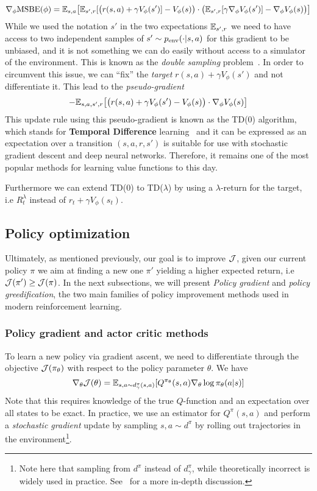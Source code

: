 $$\nabla_\phi \text{MSBE}(\phi) = \mathbb{E}_{s, a} \big[ \mathbb{E}_{s', r}[ \big( r(s,a) + \gamma V_\phi(s')] - V_\phi(s) \big) \cdot \big(\mathbb{E}_{s', r}[ \gamma \nabla_\phi V_\phi(s')] - \nabla_\phi V_\phi(s) \big)\big]$$
While we used the notation $s'$ in the two expectations $\mathbb{E}_{s', r}$ we need to have access to two independent samples of $s' \sim p_{\text{env}}(\cdot |s,a)$ for this gradient to be unbiased, and it is not something we can do easily without access to a simulator of the environment. This is known as the \emph{double sampling} problem~\citep{baird1995residual}. In order to circumvent this issue, we can ``fix'' the \emph{target} $r(s,a) + \gamma V_\phi(s')$ and not differentiate it.
This lead to the \emph{pseudo-gradient}
$$ - \mathbb{E}_{s, a, s', r} \big[\big( r(s,a) + \gamma V_\phi(s') - V_\phi(s) \big) \cdot \nabla_\phi V_\phi(s)\big]$$
This update rule using this pseudo-gradient is known as the TD(0) algorithm, which stands for \textbf{Temporal Difference} learning~\citep{sutton1988learning} and it can be expressed as an expectation over a transition $(s, a, r, s')$
 is suitable for use with stochastic gradient descent and deep neural networks. Therefore, it remains one of the most popular methods for learning value functions to this day.

Furthermore we can extend TD(0) to TD($\lambda$) by using a $\lambda$-return for the target, i.e $R^\lambda_t$ instead of $r_t + \gamma V_\phi(s_t)$.

\subsection{Policy optimization}

Ultimately, as mentioned previously, our goal is to improve ${\mathcal{J}}$, given our current policy $\pi$ we aim at finding a new one $\pi'$ yielding a higher expected return, i.e ${\mathcal{J}}(\pi') \ge {\mathcal{J}}(\pi)$. In the next subsections, we will present \emph{Policy gradient} and \emph{policy greedification}, the two main families of policy improvement methods used in modern reinforcement learning.

\subsubsection{Policy gradient and actor critic methods}
\label{subsec:pg_ac}
To learn a new policy via gradient ascent, we need to differentiate through the objective ${\mathcal{J}}(\pi_\theta)$ with respect to the policy parameter $\theta$.
We have~\citep{williams1992simple, sutton1999policy}
\begin{equation}
    \label{eq:policy_gradient}
    \nabla_\theta {\mathcal{J}}(\theta) = \mathbb{E}_{s, a \sim d^\pi_\gamma(s,a)} [ Q^{\pi_\theta}(s,a) \nabla_\theta \log \pi_\theta(a|s)]
\end{equation}
Note that this requires knowledge of the true $Q$-function and an expectation over all states to be exact. In practice, we use an estimator for $Q^\pi(s,a)$ and perform a \emph{stochastic gradient} update by sampling $s,a \sim d^\pi$ by rolling out trajectories in the environment\footnote{Note here that sampling from $d^\pi$ instead of $d^\pi_\gamma$, while theoretically incorrect is widely used in practice. See~\citep{nota2019policy} for a more in-depth discussion.}.

